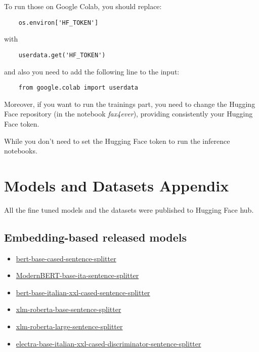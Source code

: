 \documentclass[11pt]{article}
\begin{document}
To run those on Google Colab, you should replace:

\begin{verbatim}
	os.environ['HF_TOKEN']
\end{verbatim}

with

\begin{verbatim}
	userdata.get('HF_TOKEN')
\end{verbatim}

and also you need to add the following line to the input:

\begin{verbatim}
	from google.colab import userdata
\end{verbatim}

Moreover, if you want to run the trainings part, you need to change 
the Hugging Face repository (in the notebook \emph{fax4ever}),
providing consistently your Hugging Face token.

While you don't need to set the Hugging Face token to
run the inference notebooks.

\section{Models and Datasets Appendix}
\label{sec:appendix2}

All the fine tuned models and the datasets were published to Hugging Face 
hub.

\subsection{Embedding-based released models}

 \begin{itemize}
 \item \href{https://huggingface.co/fax4ever/bert-base-cased-sentence-splitter}{bert-base-cased-sentence-splitter}
 \item \href{https://huggingface.co/fax4ever/ModernBERT-base-ita-sentence-splitter}{ModernBERT-base-ita-sentence-splitter}
 \item \href{https://huggingface.co/fax4ever/bert-base-italian-xxl-cased-sentence-splitter}{bert-base-italian-xxl-cased-sentence-splitter}
 \item \href{https://huggingface.co/fax4ever/xlm-roberta-base-sentence-splitter}{xlm-roberta-base-sentence-splitter}
 \item \href{https://huggingface.co/fax4ever/xlm-roberta-large-sentence-splitter}{xlm-roberta-large-sentence-splitter}
 \item \href{https://huggingface.co/fax4ever/electra-base-italian-xxl-cased-discriminator-sentence-splitter}{electra-base-italian-xxl-cased-discriminator-sentence-splitter}
\end{itemize}
\end{document}
